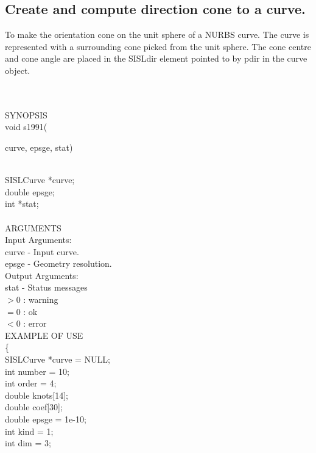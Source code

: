 \subsection{Create and compute direction cone to a curve.} 
\begin{minipg1}
		To make the orientation cone on the unit sphere of
	       	a NURBS curve. The curve is represented with
	       	a surrounding cone picked from the unit sphere. The cone centre and cone angle are placed in the SISLdir element pointed to by pdir in the curve object.
\end{minipg1} \\ \\
SYNOPSIS\\
	\>void s1991(\begin{minipg3}
		{\fov curve}, {\fov epsge}, {\fov stat})
		\end{minipg3}\\[0.3ex]
		\>\>	SISLCurve 	\>	*{\fov curve};\\
		\>\>	double 	\>	{\fov epsge};\\
		\>\>	int 	\>	*{\fov stat};\\
\\
ARGUMENTS\\
	\>Input Arguments:\\
	\>\>	{\fov curve}	\> - \>	Input curve.\\
	\>\>	{\fov epsge}	\> - \>	Geometry resolution.\\
	\>Output Arguments:\\
	\>\>	{\fov stat}	\> - \>	Status messages\\
		\>\>\>\>\>		$> 0$	: warning\\
		\>\>\>\>\>		$= 0$	: ok\\
		\>\>\>\>\>		$< 0$	: error\\
EXAMPLE OF USE\\
		\>	\{ \\
  		\>\>	SISLCurve    \>	*{\fov curve} = NULL;\\
  		\>\>	int    \>	{\fov number} = 10;\\
  		\>\>	int    \>	{\fov order} = 4;\\
  		\>\>	double \>	{\fov knots[14]};\\
  		\>\>	double \>	{\fov coef[30]};\\
  		\>\>	double \>	{\fov epsge} = 1e-10;\\
  		\>\>	int    \>	{\fov kind} = 1;\\
  		\>\>	int    \>	{\fov dim} = 3;\\
